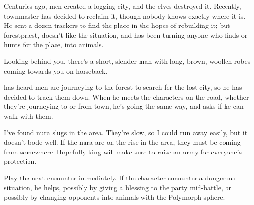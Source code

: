\begin{multicols}{2}

\resumecontents[Town]
\resumecontents[Forest]

\label{herenofarther}

\stopcontents[Town]
\stopcontents[Forest]

Centuries ago, men created a logging city, and the elves destroyed it.
Recently, \gls{townmaster} has decided to reclaim it, though nobody knows exactly where it is.
He sent a dozen trackers to find the place in the hopes of rebuilding it; but \gls{forestpriest}, doesn't like the situation, and has been turning anyone who finds or hunts for the place, into animals.


\begin{boxtext}

	Looking behind you, there's a short, slender man with long, brown, woollen robes coming towards you on horseback.

\end{boxtext}

 has heard men are journeying to the forest to search for the lost city, so he has decided to track them down.
When he meets the characters on the road, whether they're journeying to or from town, he's going the same way, and asks if he can walk with them.

\begin{speechtext}

	I've found nura slugs in the area.
	They're slow, so I could run away easily, but it doesn't bode well.
	If the nura are on the rise in the area, they must be coming from somewhere.
	Hopefully \gls{king} will make sure to raise an army for everyone's protection.

\end{speechtext}

Play the next encounter immediately.
If the character encounter a dangerous situation, he helps, possibly by giving a blessing to the party mid-battle, or possibly by changing opponents into animals with the Polymorph sphere.

\forestpriest


\begin{boxtext}


\end{boxtext}
\end{multicols}
